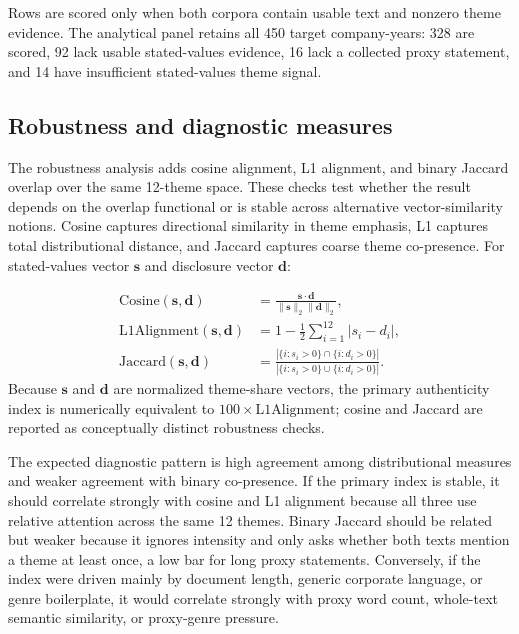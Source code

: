 \documentclass[11pt]{article}
\begin{document}
Rows are scored only when both corpora contain usable text and nonzero theme evidence. The
analytical panel retains all 450 target company-years: 328 are scored, 92 lack usable stated-values
evidence, 16 lack a collected proxy statement, and 14 have insufficient stated-values theme signal.

\subsection{Robustness and diagnostic measures}

The robustness analysis adds cosine alignment, L1 alignment, and binary Jaccard overlap over the
same 12-theme space. These checks test whether the result depends on the overlap functional or is
stable across alternative vector-similarity notions. Cosine captures directional similarity in theme
emphasis, L1 captures total distributional distance, and Jaccard captures coarse theme co-presence.
For stated-values vector $\mathbf{s}$ and disclosure vector $\mathbf{d}$:

\begin{align}
\mathrm{Cosine}(\mathbf{s}, \mathbf{d}) &=
\frac{\mathbf{s}\cdot \mathbf{d}}{\lVert \mathbf{s}\rVert_2 \lVert \mathbf{d}\rVert_2}, \\
\mathrm{L1Alignment}(\mathbf{s}, \mathbf{d}) &=
1 - \frac{1}{2}\sum_{i=1}^{12}|s_i-d_i|, \\
\mathrm{Jaccard}(\mathbf{s}, \mathbf{d}) &=
\frac{|\{i:s_i>0\}\cap\{i:d_i>0\}|}{|\{i:s_i>0\}\cup\{i:d_i>0\}|}.
\end{align}
Because $\mathbf{s}$ and $\mathbf{d}$ are normalized theme-share vectors, the primary authenticity
index is numerically equivalent to $100 \times \mathrm{L1Alignment}$; cosine and Jaccard are
reported as conceptually distinct robustness checks.

The expected diagnostic pattern is high agreement among distributional measures and weaker
agreement with binary co-presence. If the primary index is stable, it should correlate strongly with
cosine and L1 alignment because all three use relative attention across the same 12 themes. Binary
Jaccard should be related but weaker because it ignores intensity and only asks whether both texts
mention a theme at least once, a low bar for long proxy statements. Conversely, if the index were
driven mainly by document length, generic corporate language, or genre boilerplate, it would
correlate strongly with proxy word count, whole-text semantic similarity, or proxy-genre pressure.
\end{document}
